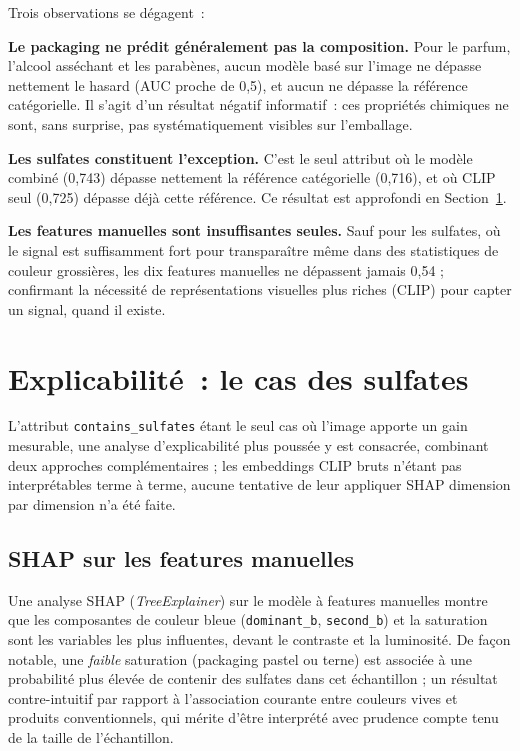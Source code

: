 \documentclass[11pt,a4paper]{article}
\begin{document}
Trois observations se dégagent~:

\textbf{Le packaging ne prédit généralement pas la composition.} Pour le parfum, l'alcool asséchant et les parabènes, aucun modèle basé sur l'image ne dépasse nettement le hasard (AUC proche de 0{,}5), et aucun ne dépasse la référence catégorielle. Il s'agit d'un résultat négatif informatif~: ces propriétés chimiques ne sont, sans surprise, pas systématiquement visibles sur l'emballage.

\textbf{Les sulfates constituent l'exception.} C'est le seul attribut où le modèle combiné (0{,}743) dépasse nettement la référence catégorielle (0{,}716), et où CLIP seul (0{,}725) dépasse déjà cette référence. Ce résultat est approfondi en Section~\ref{sec:shap}.

\textbf{Les features manuelles sont insuffisantes seules.} Sauf pour les sulfates, où le signal est suffisamment fort pour transparaître même dans des statistiques de couleur grossières, les dix features manuelles ne dépassent jamais 0{,}54 ; confirmant la nécessité de représentations visuelles plus riches (CLIP) pour capter un signal, quand il existe.

\section{Explicabilité~: le cas des sulfates}
\label{sec:shap}

L'attribut \texttt{contains\_sulfates} étant le seul cas où l'image apporte un gain mesurable, une analyse d'explicabilité plus poussée y est consacrée, combinant deux approches complémentaires ; les embeddings CLIP bruts n'étant pas interprétables terme à terme, aucune tentative de leur appliquer SHAP dimension par dimension n'a été faite.

\subsection{SHAP sur les features manuelles}

Une analyse SHAP (\emph{TreeExplainer}) sur le modèle à features manuelles montre que les composantes de couleur bleue (\texttt{dominant\_b}, \texttt{second\_b}) et la saturation sont les variables les plus influentes, devant le contraste et la luminosité. De façon notable, une \emph{faible} saturation (packaging pastel ou terne) est associée à une probabilité plus élevée de contenir des sulfates dans cet échantillon ; un résultat contre-intuitif par rapport à l'association courante entre couleurs vives et produits conventionnels, qui mérite d'être interprété avec prudence compte tenu de la taille de l'échantillon.
\end{document}
